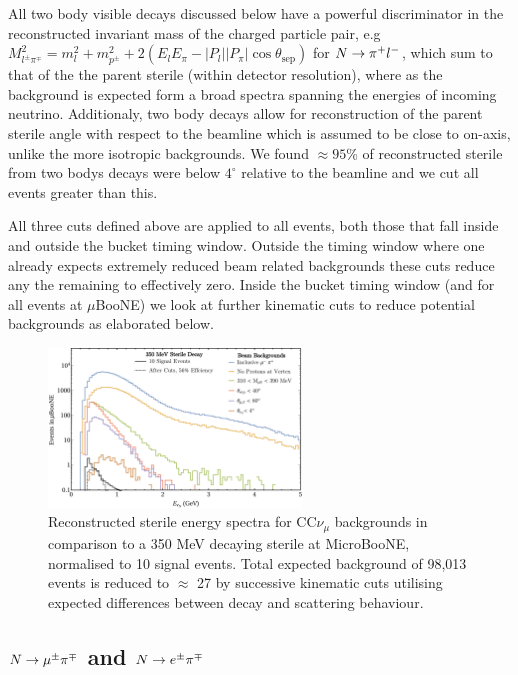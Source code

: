 \documentclass[11pt, a4paper]{article}
\def\muboone{MicroBooNE}
\def\ster{\ensuremath N}
\begin{document}
All two body visible decays discussed below have a powerful discriminator in
the reconstructed invariant mass of the charged particle pair, e.g  $M_{l^\pm
\pi^\mp}^2=m_l^2+m_{p^\pm}^2+ 2(E_l E_\pi - |P_l||P_\pi|\cos\theta_\text{sep})$
for $\ster\rightarrow \pi^+ l^-$, which sum to that of the the parent sterile
(within detector resolution), where as the background is expected form a broad
spectra spanning the energies of incoming neutrino. Additionaly, two body
decays allow for reconstruction of the parent sterile angle with respect to the
beamline which is assumed to be close to on-axis, unlike the more isotropic
backgrounds. We found $\approx 95$\% of reconstructed sterile from two bodys
decays were below $4^\circ$ relative to the beamline and we cut all events
greater than this. 

All three cuts defined above are applied to all events, both those that fall inside and outside the bucket timing window. Outside the timing window where one already expects extremely reduced beam related backgrounds these cuts reduce any the remaining to effectively zero. Inside the bucket timing window (and for all events at $\mu$BooNE) we look at further kinematic cuts to reduce potential backgrounds as elaborated below.

\begin{figure}[h]
\center
\includegraphics[width=0.6\textwidth,clip,trim=0 0 0 0]{figures/mu_pi_cutflow.pdf}

\caption{\label{fig:mu_pi_cutflow} Reconstructed sterile energy spectra for
CC$\nu_\mu$ backgrounds in comparison to a 350 MeV decaying sterile at
\muboone, normalised to 10 signal events. Total expected background of 98,013
events is reduced to $\approx$ 27 by successive kinematic cuts utilising
expected differences between decay and scattering behaviour. }

\end{figure}

\subsection{$\ster \rightarrow \mu^\pm \pi^\mp$ and $\ster \rightarrow e^\pm \pi^\mp$   }
\end{document}
